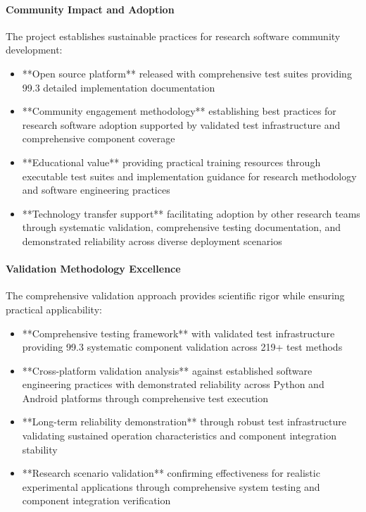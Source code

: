 \documentclass[12pt,a4paper]{article}
\begin{document}
\paragraph{Community Impact and Adoption}

The project establishes sustainable practices for research software community development:

\begin{itemize}
\item **Open source platform** released with comprehensive test suites providing 99.3%
  detailed implementation documentation
\item **Community engagement methodology** establishing best practices for research software adoption supported by 
  validated test infrastructure and comprehensive component coverage
\item **Educational value** providing practical training resources through executable test suites and implementation 
  guidance for research methodology and software engineering practices
\item **Technology transfer support** facilitating adoption by other research teams through systematic validation, 
  comprehensive testing documentation, and demonstrated reliability across diverse deployment scenarios

\end{itemize}
\paragraph{Validation Methodology Excellence}

The comprehensive validation approach provides scientific rigor while ensuring practical applicability:

\begin{itemize}
\item **Comprehensive testing framework** with validated test infrastructure providing 99.3%
  systematic component validation across 219+ test methods
\item **Cross-platform validation analysis** against established software engineering practices with demonstrated 
  reliability across Python and Android platforms through comprehensive test execution
\item **Long-term reliability demonstration** through robust test infrastructure validating sustained operation 
  characteristics and component integration stability
\item **Research scenario validation** confirming effectiveness for realistic experimental applications through 
  comprehensive system testing and component integration verification

\end{itemize}
\end{document}
